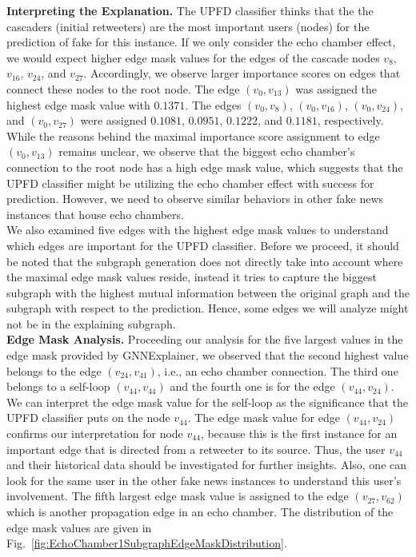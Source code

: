 \textbf{Interpreting the Explanation.} The UPFD classifier thinks that the the cascaders (initial retweeters) are the most important users (nodes) for the prediction of fake for this instance. If we only consider the echo chamber effect, we would expect higher edge mask values for the edges of the cascade nodes $v_8$, $v_{16}$, $v_{24}$, and $v_{27}$. Accordingly, we observe larger importance scores on edges that connect these nodes to the root node. The edge $(v_0, v_{13})$ was assigned the highest edge mask value with $0.1371$. The edges $(v_0, v_8)$, $(v_0, v_{16})$, $(v_0, v_{24})$, and $(v_0, v_{27})$ were assigned $0.1081$, $0.0951$, $0.1222$, and $0.1181$, respectively.  While the reasons behind the maximal importance score assignment to edge $(v_0, v_{13})$ remains unclear, we observe that the biggest echo chamber's connection to the root node has a high edge mask value, which suggests that the UPFD classifier might be utilizing the echo chamber effect with success for prediction. However, we need to observe similar behaviors in other fake news instances that house echo chambers.\\
We also examined five edges with the highest edge mask values to understand which edges are important for the UPFD classifier. Before we proceed, it should be noted that the subgraph generation does not directly take into account where the maximal edge mask values reside, instead it tries to capture the biggest subgraph with the highest mutual information between the original graph and the subgraph with respect to the prediction. Hence, some edges we will analyze might not be in the explaining subgraph.\\
\textbf{Edge Mask Analysis.} Proceeding our analysis for the five largest values in the edge mask provided by GNNExplainer, we observed that the second highest value belongs to the edge $(v_{24}, v_{41})$, i.e., an echo chamber connection. The third one belongs to a self-loop $(v_{44}, v_{44})$ and the fourth one is for the edge $(v_{44}, v_{24})$. We can interpret the edge mask value for the self-loop as the significance that the UPFD classifier puts on the node $v_{44}$. The edge mask value for edge $(v_{44}, v_{24})$ confirms our interpretation for node $v_{44}$, because this is the first instance for an important edge that is directed from a retweeter to its source. Thus, the user $v_{44}$ and their historical data should be investigated for further insights. Also, one can look for the same user in the other fake news instances to understand this user's involvement. The fifth largest edge mask value is assigned to the edge $(v_{27}, v_{62})$ which is another propagation edge in an echo chamber. The distribution of the edge mask values are given in Fig.~\ref{fig:EchoChamber1SubgraphEdgeMaskDistribution}.\\
